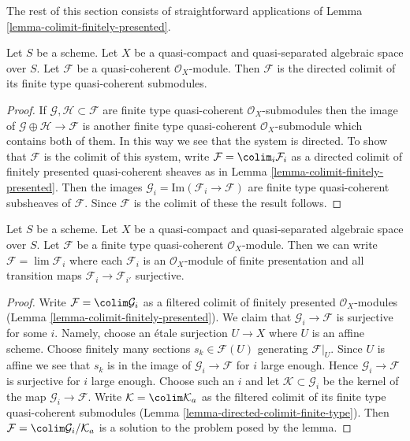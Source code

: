 \noindent
The rest of this section consists of straightforward
applications of Lemma \ref{lemma-colimit-finitely-presented}.

\begin{lemma}
\label{lemma-directed-colimit-finite-type}
Let $S$ be a scheme. Let $X$ be a quasi-compact and quasi-separated
algebraic space over $S$.
Let $\mathcal{F}$ be a quasi-coherent $\mathcal{O}_X$-module.
Then $\mathcal{F}$ is the directed colimit of its finite type
quasi-coherent submodules.
\end{lemma}

\begin{proof}
If $\mathcal{G}, \mathcal{H} \subset \mathcal{F}$ are finite type
quasi-coherent $\mathcal{O}_X$-submodules then the image
of $\mathcal{G} \oplus \mathcal{H} \to \mathcal{F}$ is another
finite type quasi-coherent $\mathcal{O}_X$-submodule which contains
both of them. In this way we see that the system is directed.
To show that $\mathcal{F}$ is the colimit of this system, write
$\mathcal{F} = \colim_i \mathcal{F}_i$ as a directed
colimit of finitely presented quasi-coherent sheaves as in
Lemma \ref{lemma-colimit-finitely-presented}.
Then the images $\mathcal{G}_i = \text{Im}(\mathcal{F}_i \to \mathcal{F})$ are
finite type quasi-coherent subsheaves of $\mathcal{F}$. Since
$\mathcal{F}$ is the colimit of these the result follows.
\end{proof}

\begin{lemma}
\label{lemma-finite-directed-colimit-surjective-maps}
Let $S$ be a scheme. Let $X$ be a quasi-compact and quasi-separated
algebraic space over $S$. Let $\mathcal{F}$ be a finite type
quasi-coherent $\mathcal{O}_X$-module. Then we can write
$\mathcal{F} = \lim \mathcal{F}_i$ where each $\mathcal{F}_i$ is an
$\mathcal{O}_X$-module of finite presentation and all transition maps
$\mathcal{F}_i \to \mathcal{F}_{i'}$ surjective.
\end{lemma}

\begin{proof}
Write $\mathcal{F} = \colim \mathcal{G}_i$ as a filtered colimit of
finitely presented $\mathcal{O}_X$-modules
(Lemma \ref{lemma-colimit-finitely-presented}).
We claim that $\mathcal{G}_i \to \mathcal{F}$ is surjective for some $i$.
Namely, choose an \'etale surjection $U \to X$ where $U$ is an affine scheme.
Choose finitely many sections $s_k \in \mathcal{F}(U)$ generating
$\mathcal{F}|_U$. Since $U$ is affine we see that $s_k$ is in the image
of $\mathcal{G}_i \to \mathcal{F}$ for $i$ large enough. Hence
$\mathcal{G}_i \to \mathcal{F}$ is surjective for $i$ large enough.
Choose such an $i$ and let $\mathcal{K} \subset \mathcal{G}_i$ be the
kernel of the map $\mathcal{G}_i \to \mathcal{F}$. Write
$\mathcal{K} = \colim \mathcal{K}_a$
as the filtered colimit of its finite type quasi-coherent submodules
(Lemma \ref{lemma-directed-colimit-finite-type}). Then
$\mathcal{F} = \colim \mathcal{G}_i/\mathcal{K}_a$ is a solution
to the problem posed by the lemma.
\end{proof}

